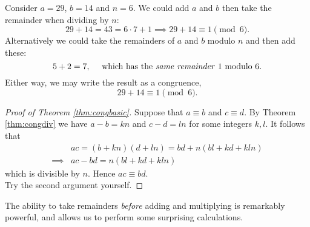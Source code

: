 \begin{example} 
Consider $a=29$, $b=14$ and $n=6$. We could add $a$ and $b$ then take the remainder when dividing by $n$:
\[29+14=43=6\cdot 7+1\implies 29+14\equiv 1\pmod 6.\]
Alternatively we could take the remainders of $a$ and $b$ modulo $n$ and then add these:
\[5+2=7,\quad\text{ which has the \emph{same remainder} 1 modulo 6.}\]
Either way, we may write the result as a congruence,
\[29+14\equiv 1\pmod 6.\]
\end{example}

\begin{proof}[Proof of Theorem \ref{thm:congbasic}]
Suppose that $a\equiv b$ and $c\equiv d$. By Theorem \ref{thm:congdiv} we have $a-b=kn$ and $c-d=ln$ for some integers $k,l$. It follows that
\begin{align*}
&ac=(b+kn)(d+ln)=bd+n(bl+kd+kln)\\
\implies &ac-bd=n(bl+kd+kln)
\end{align*}
which is divisible by $n$. Hence $ac\equiv bd$.\\
Try the second argument yourself.
\end{proof}

\noindent The ability to take remainders \emph{before} adding and multiplying is remarkably powerful, and allows us to perform some surprising calculations.

